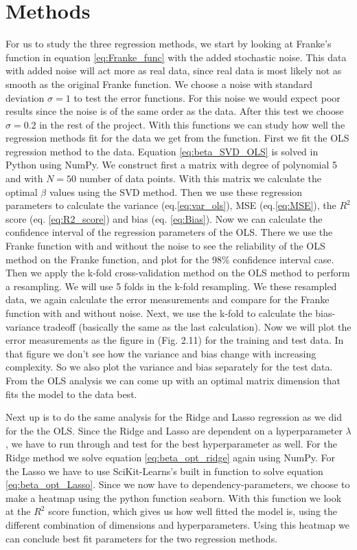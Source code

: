 \documentclass[12pt,a4paper,english]{article}
\begin{document}
\section{Methods}
For us to study the three regression methods, we start by looking at Franke's function in equation \ref{eq:Franke_func} with the added stochastic noise. This data with added noise will act more as real data, since real data is most likely not as smooth as the original Franke function. We choose a noise with standard deviation $\sigma=1$ to test the error functions. For this noise we would expect poor results since the noise is of the same order as the data. After this test we choose $\sigma=0.2$ in the rest of the project. With this functions we can study how well the regression methods fit for the data we get from the function. First we fit the OLS regression method to the data. Equation \ref{eq:beta_SVD_OLS} is solved in Python using NumPy. We construct first a matrix with degree of polynomial 5 and with $N=50$ number of data points. With this matrix we calculate the optimal $\beta$ values using the SVD method. Then we use these regression parameters to calculate the variance (eq.\ref{eq:var_ols}), MSE (eq.\ref{eq:MSE}), the $R^2$ score (eq. \ref{eq:R2_score}) and bias (eq. \ref{eq:Bias}). Now we can calculate the confidence interval of the regression parameters of the OLS. There we use the Franke function with and without the noise to see the reliability of the OLS method on the Franke function, and plot for the 98\% confidence interval case. Then we apply the k-fold cross-validation method on the OLS method to perform a resampling. We will use 5 folds in the k-fold resampling. We these resampled data, we again calculate the error measurements and compare for the Franke function with and without noise. Next, we use the k-fold to calculate the bias-variance tradeoff (basically the same as the last calculation). Now we will plot the error measurements as the figure in \citet{hastie2009} (Fig. 2.11) for the training and test data. In that figure we don't see how the variance and bias change with increasing complexity. So we also plot the variance and bias separately for the test data. From the OLS analysis we can come up with an optimal matrix dimension that fits the model to the data best.

Next up is to do the same analysis for the Ridge and Lasso regression as we did for the the OLS. Since the Ridge and Lasso are dependent on a hyperparameter $\lambda$, we have to run through and test for the best hyperparameter as well. For the Ridge method we solve equation \ref{eq:beta_opt_ridge} again using NumPy. For the Lasso we have to use SciKit-Learns's built in function to solve equation \ref{eq:beta_opt_Lasso}. Since we now have to dependency-parameters, we choose to make a heatmap using the python function seaborn. With this function we look at the $R^2$ score function, which gives us how well fitted the model is, using the different combination of dimensions and hyperparameters. Using this heatmap we can conclude best fit parameters for the two regression methods.
\end{document}
